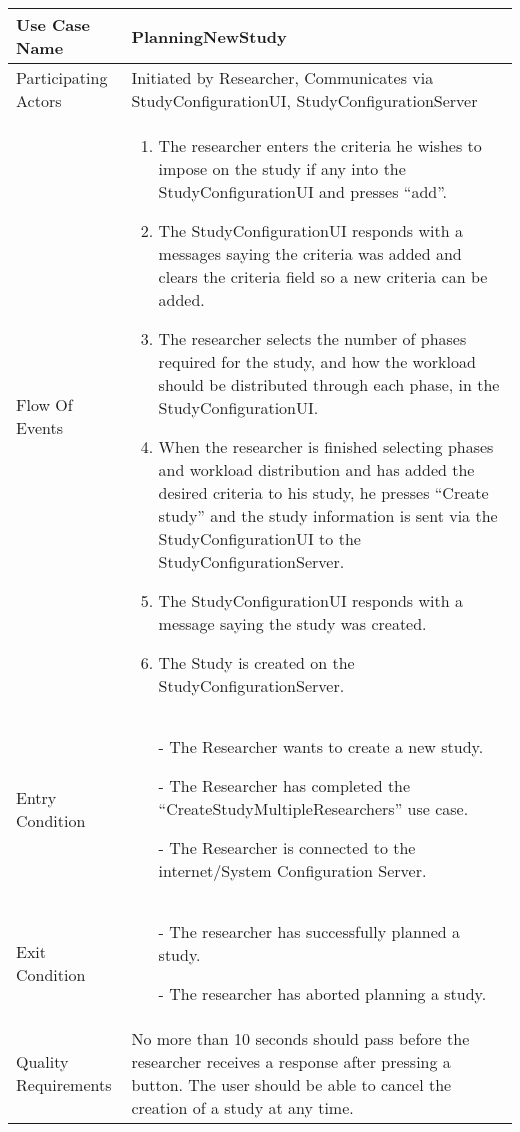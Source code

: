 \begin{center}
	\begin{tabular}{ | l | p{10cm} |} \hline
	    Use Case Name & \textbf{PlanningNewStudy}\\ \hline
	    Participating Actors &  Initiated by Researcher, Communicates via StudyConfigurationUI, StudyConfigurationServer\\ \hline
	    Flow Of Events &
	    \begin{enumerate}
		    \item The researcher enters the criteria he wishes to impose on the study if any into the StudyConfigurationUI and presses “add”.
		    \item The StudyConfigurationUI responds with a messages saying the criteria was added and clears the criteria field so a new criteria can be added.
		    \item The researcher selects the number of phases required for the study, and how the workload should be distributed through each phase, in the StudyConfigurationUI.
		    \item When the researcher is finished selecting phases and workload distribution and has added the desired criteria to his study, he presses “Create study” and the study information is sent via the StudyConfigurationUI to the StudyConfigurationServer.
		    \item The StudyConfigurationUI responds with a message saying the study was created.
		    \item The Study is created on the StudyConfigurationServer.
		    		    		    	    
	    \end{enumerate}\\ \hline
	    Entry Condition & 
	    \begin{enumerate}
		    \item[-] The Researcher wants to create a new study.
		    \item[-] The Researcher has completed the “CreateStudyMultipleResearchers” use case.
		    \item[-] The Researcher is connected to the internet/System Configuration Server.    
	    \end{enumerate}
	    \\ \hline
	    Exit Condition &
	   	\begin{enumerate}
	   		\item[-] The researcher has successfully planned a study.
	   		\item[-] The researcher has aborted planning a study.
	   	\end{enumerate}
	   	\\ \hline
	    Quality Requirements & No more than 10 seconds should pass before the researcher receives a response after pressing a button.
	    The user should be able to cancel the creation of a study at any time.\\ \hline
	\end{tabular}
\end{center}

